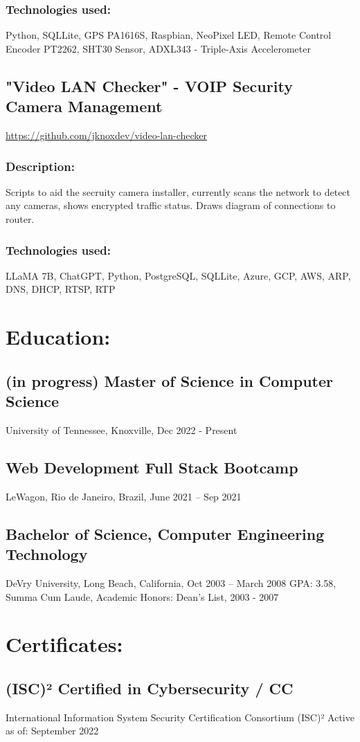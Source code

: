 \documentclass[letter,10pt]{article}
\begin{document}
\subsubsection*{Technologies used:}
\label{sec:org902a6ea}
Python, SQLLite, GPS PA1616S, Raspbian, NeoPixel LED, Remote Control Encoder PT2262, SHT30 Sensor, ADXL343 - Triple-Axis Accelerometer

\subsection*{"Video LAN Checker" - VOIP Security Camera Management}
\label{sec:orgdb772b1}
\url{https://github.com/jknoxdev/video-lan-checker}
\subsubsection*{Description:}
\label{sec:orgdf43738}
Scripts to aid the secruity camera installer, currently scans the network to detect any cameras, shows encrypted traffic status. Draws diagram of connections to router.
\subsubsection*{Technologies used:}
\label{sec:org48daebf}
LLaMA 7B, ChatGPT, Python, PostgreSQL, SQLLite, Azure, GCP, AWS, ARP, DNS, DHCP, RTSP, RTP

\section*{Education:}
\label{sec:org62a53fc}
\subsection*{(in progress) Master of Science in Computer Science}
\label{sec:org2879124}
University of Tennessee, Knoxville, Dec 2022 - Present
\subsection*{Web Development Full Stack Bootcamp}
\label{sec:orgbee1a54}
LeWagon, Rio de Janeiro, Brazil, June 2021 – Sep 2021
\subsection*{Bachelor of Science, Computer Engineering Technology}
\label{sec:org1b59397}
DeVry University, Long Beach, California, Oct 2003 – March 2008
GPA: 3.58, Summa Cum Laude, Academic Honors: Dean’s List, 2003 - 2007

\section*{Certificates:}
\label{sec:org9eac498}
\subsection*{(ISC)² Certified in Cybersecurity / CC}
\label{sec:org6976a3f}
International Information System Security Certification Consortium (ISC)²
Active as of: September 2022
\end{document}

